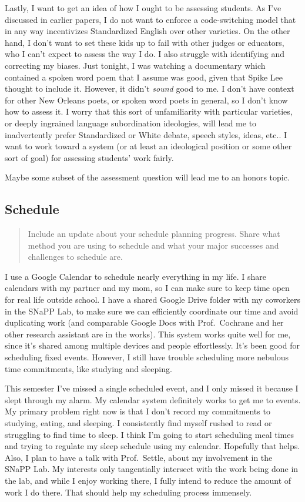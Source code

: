 \documentclass[doc,12pt]{apa6}
\begin{document}
Lastly, I want to get an idea of how I ought to be assessing students.
As I've discussed in earlier papers, I do not want to enforce a
code-switching model that in any way incentivizes Standardized English
over other varieties. On the other hand, I don't want to set these kids
up to fail with other judges or educators, who I can't expect to assess
the way I do. I also struggle with identifying and correcting my biases.
Just tonight, I was watching a documentary \cite{Lee06} which contained a
spoken word poem that I assume was good, given that Spike Lee thought to
include it. However, it didn't \emph{sound} good to me. I don't have
context for other New Orleans poets, or spoken word poets in general, so
I don't know how to assess it. I worry that this sort of unfamiliarity
with particular varieties, or deeply ingrained language subordination
ideologies, will lead me to inadvertently prefer Standardized or White
debate, speech styles, ideas, etc.. I want to work toward a system (or
at least an ideological position or some other sort of goal) for
assessing students' work fairly.

Maybe some subset of the assessment question will lead me to an honors
topic.

\subsection{Schedule}\label{schedule}

\begin{quote}
		Include an update about your schedule planning progress. Share what method you are using to schedule and what your major successes and
challenges to schedule are.
\end{quote}

I use a Google Calendar to schedule nearly everything in my life. I
share calendars with my partner and my mom, so I can make sure to keep
time open for real life outside school. I have a shared Google Drive
folder with my coworkers in the SNaPP Lab, to make sure we can
efficiently coordinate our time and avoid duplicating work (and
comparable Google Docs with Prof.~Cochrane and her other research
assistant are in the works). This system works quite well for me, since
it's shared among multiple devices and people effortlessly. It's been
good for scheduling fixed events. However, I still have trouble
scheduling more nebulous time commitments, like studying and sleeping.

This semester I've missed a single scheduled event, and I only missed it
because I slept through my alarm. My calendar system definitely works to
get me to events. My primary problem right now is that I don't record my
commitments to studying, eating, and sleeping. I consistently find
myself rushed to read or struggling to find time to sleep. I think I'm
going to start scheduling meal times and trying to regulate my sleep
schedule using my calendar. Hopefully that helps. Also, I plan to have a
talk with Prof.~Settle, about my involvement in the SNaPP Lab. My
interests only tangentially intersect with the work being done in the
lab, and while I enjoy working there, I fully intend to reduce the
amount of work I do there. That should help my scheduling process
immensely.

\clearpage



\end{document}
